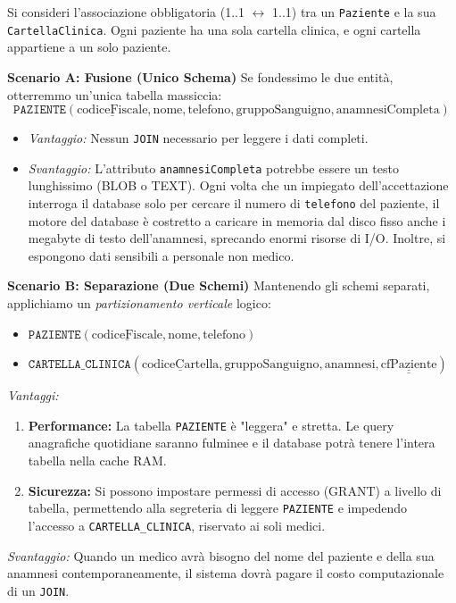 \begin{example}
Si consideri l'associazione obbligatoria (1..1 $\leftrightarrow$ 1..1) tra un \texttt{Paziente} e la sua \texttt{CartellaClinica}. Ogni paziente ha una sola cartella clinica, e ogni cartella appartiene a un solo paziente.

\textbf{Scenario A: Fusione (Unico Schema)}
Se fondessimo le due entità, otterremmo un'unica tabella massiccia:
$$\texttt{PAZIENTE}(\underline{\text{codiceFiscale}}, \text{nome}, \text{telefono}, \text{gruppoSanguigno}, \text{anamnesiCompleta})$$
\begin{itemize}
    \item \textit{Vantaggio:} Nessun \texttt{JOIN} necessario per leggere i dati completi.
    \item \textit{Svantaggio:} L'attributo \texttt{anamnesiCompleta} potrebbe essere un testo lunghissimo (BLOB o TEXT). Ogni volta che un impiegato dell'accettazione interroga il database solo per cercare il numero di \texttt{telefono} del paziente, il motore del database è costretto a caricare in memoria dal disco fisso anche i megabyte di testo dell'anamnesi, sprecando enormi risorse di I/O. Inoltre, si espongono dati sensibili a personale non medico.
\end{itemize}

\medskip

\textbf{Scenario B: Separazione (Due Schemi)}
Mantenendo gli schemi separati, applichiamo un \textit{partizionamento verticale} logico:
\begin{itemize}
    \item $\texttt{PAZIENTE}(\underline{\text{codiceFiscale}}, \text{nome}, \text{telefono})$
    \item $\texttt{CARTELLA\_CLINICA}(\underline{\text{codiceCartella}}, \text{gruppoSanguigno}, \text{anamnesi}, \underline{\underline{\text{cfPaziente}}})$
\end{itemize}

\medskip

\textit{Vantaggi:} 
\begin{enumerate}
    \item \textbf{Performance:} La tabella \texttt{PAZIENTE} è "leggera" e stretta. Le query anagrafiche quotidiane saranno fulminee e il database potrà tenere l'intera tabella nella cache RAM.
    \item \textbf{Sicurezza:} Si possono impostare permessi di accesso (GRANT) a livello di tabella, permettendo alla segreteria di leggere \texttt{PAZIENTE} e impedendo l'accesso a \texttt{CARTELLA\_CLINICA}, riservato ai soli medici.
\end{enumerate}

\medskip

\textit{Svantaggio:} Quando un medico avrà bisogno del nome del paziente e della sua anamnesi contemporaneamente, il sistema dovrà pagare il costo computazionale di un \texttt{JOIN}.
\end{example}

